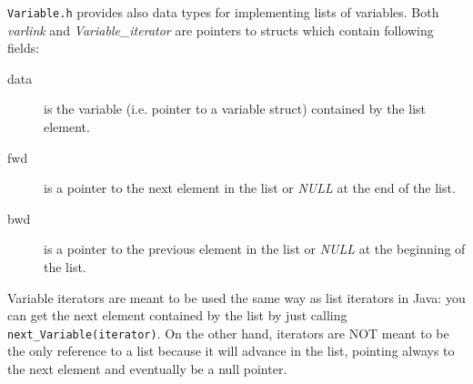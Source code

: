 \documentclass[12pt,a4paper]{report}
\newcommand{\cdatatype}[1]{{\it #1}}
\newcommand{\examplecode}[1]{\texttt{#1}}
\newcommand{\cfilename}[1]{\texttt{#1}}
\begin{document}
\cfilename{Variable.h} provides also data types for implementing lists of
variables. Both \cdatatype{varlink} and \cdatatype{Variable\_iterator} are
pointers to structs which contain following fields:
\begin{description}
\item[data] is the variable (i.e. pointer to a variable struct) 
contained by the list element.

\item[fwd] is a pointer to the next element in the list or \cdatatype{NULL}
at the end of the list.

\item[bwd] is a pointer to the previous element in the list or 
\cdatatype{NULL} at the beginning of the list.
\end{description}
Variable iterators are meant to be used the same way as list iterators
in Java: you can get the next element contained by the list by just 
calling \examplecode{next\_Variable(iterator)}. On the other hand, iterators
are NOT meant to be the only reference to a list because it will
advance in the list, pointing always to the next element and eventually
be a null pointer.
\end{document}
